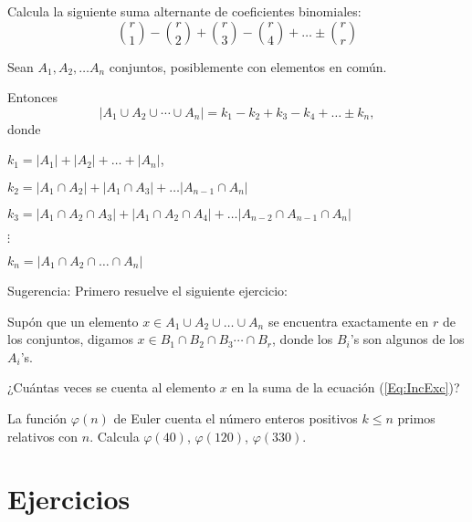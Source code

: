 \begin{ejercicio}
Calcula la siguiente suma alternante de coeficientes binomiales:
$${r \choose 1}-{r \choose 2}+{r \choose 3}-{r \choose 4}+\dots \pm {r \choose r}$$
\end{ejercicio}

\begin{teorema}
Sean $A_1,A_2,\dots A_n$ conjuntos, posiblemente con elementos en común.

Entonces 
\begin{equation} \label{Eq:IncExc}
|A_1\cup A_2 \cup \cdots \cup  A_n|=k_1-k_2+k_3-k_4+\dots \pm k_n,
\end{equation}
donde 

$k_1=|A_1|+|A_2|+\dots +|A_n|$,

$k_2=|A_1\cap A_2|+|A_1\cap A_3|+ \dots |A_{n-1}\cap A_n|$

$k_3=|A_1\cap A_2 \cap A_3|+|A_1\cap A_2 \cap A_4|+ \dots |A_{n-2}\cap A_{n-1}\cap A_n|$

$\vdots$

$k_n=|A_1\cap A_2\cap \dots  \cap A_n|$
\end{teorema}

Sugerencia: Primero resuelve el siguiente ejercicio:

\begin{ejercicio}
Supón que un elemento $x\in A_1\cup A_2 \cup \dots \cup A_n$ se encuentra exactamente en $r$ de los conjuntos, digamos $x\in B_1 \cap B_2 \cap B_3 \cdots \cap B_r$, donde los $B_i$'s son algunos de los $A_i$'s.

¿Cuántas veces se cuenta al elemento $x$ en la suma de la ecuación (\ref{Eq:IncExc})?
\end{ejercicio}

\newpage 

\begin{ejercicio}
La función $\varphi(n)$ de Euler cuenta el número enteros positivos $k\leq n$ primos relativos con $n$. Calcula  $\varphi(40)$, $\varphi(120)$, $\varphi(330)$. 
\end{ejercicio}
\vspace{6cm}





\section{Ejercicios}

